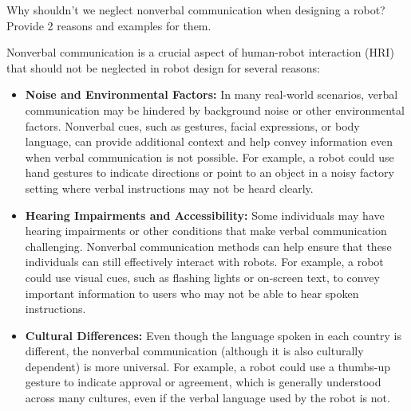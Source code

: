 \begin{ejercicio}
    Why shouldn't we neglect nonverbal communication when designing a robot? Provide 2 reasons and examples for them.

    Nonverbal communication is a crucial aspect of human-robot interaction (HRI) that should not be neglected in robot design for several reasons:
    \begin{itemize}
        \item \textbf{Noise and Environmental Factors:} In many real-world scenarios, verbal communication may be hindered by background noise or other environmental factors. Nonverbal cues, such as gestures, facial expressions, or body language, can provide additional context and help convey information even when verbal communication is not possible. For example, a robot could use hand gestures to indicate directions or point to an object in a noisy factory setting where verbal instructions may not be heard clearly.
        \item \textbf{Hearing Impairments and Accessibility:} Some individuals may have hearing impairments or other conditions that make verbal communication challenging. Nonverbal communication methods can help ensure that these individuals can still effectively interact with robots. For example, a robot could use visual cues, such as flashing lights or on-screen text, to convey important information to users who may not be able to hear spoken instructions.
        \item \textbf{Cultural Differences:} Even though the language spoken in each country is different, the nonverbal communication (although it is also culturally dependent) is more universal. For example, a robot could use a thumbs-up gesture to indicate approval or agreement, which is generally understood across many cultures, even if the verbal language used by the robot is not.
    \end{itemize}
\end{ejercicio}

